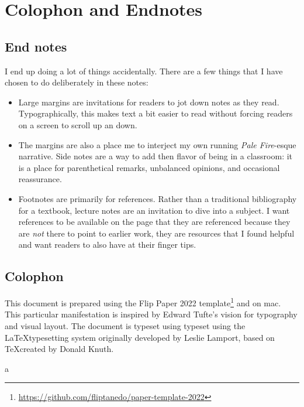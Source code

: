 \chapter{Colophon and Endnotes}


\section{End notes}

I end up doing a lot of things accidentally. There are a few things that I have chosen to do deliberately in these notes:
\begin{itemize}
	\item Large margins are invitations for readers to jot down notes as they read. Typographically, this makes text a bit easier to read without forcing readers on a screen to scroll up an down.
	\item The margins are also a place me to interject my own running \emph{Pale Fire}-esque narrative. Side notes are a way to add then flavor of being in a classroom: it is a place for parenthetical remarks, unbalanced opinions, and occasional reassurance. 
	\item Footnotes are primarily for references. Rather than a traditional bibliography for a textbook, lecture notes are an invitation to dive into a subject. I want references to be available on the page that they are referenced because they are \emph{not} there to point to earlier work, they are resources that I found helpful and want readers to also have at their finger tips.
\end{itemize}

\section{Colophon}

This document is prepared using the Flip Paper 2022 template\footnote{\url{https://github.com/fliptanedo/paper-template-2022}} and  on mac. This particular manifestation is inspired by Edward Tufte's vision for typography and visual layout.\autocite{tufte2001visual} The document is typeset using typeset using the \LaTeX typesetting system originally developed by Leslie Lamport, based on \TeX created by Donald Knuth. 

a